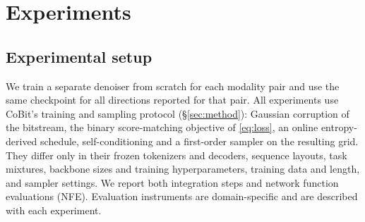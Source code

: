\section{Experiments}
\label{sec:exp}

\subsection{Experimental setup}
\label{sec:exp:setup}

We train a separate denoiser from scratch for each modality pair and use the same checkpoint for all
directions reported for that pair. All experiments use CoBit's training and sampling protocol (\S\ref{sec:method}):
Gaussian corruption of the bitstream, the binary score-matching objective of \eqref{eq:loss}, an
online entropy-derived schedule, self-conditioning and a first-order sampler
on the resulting grid. They differ only in their frozen tokenizers and decoders, sequence layouts, task mixtures,
backbone sizes and training hyperparameters, training data and length, and sampler settings. We report both integration steps and
network function evaluations (NFE). Evaluation instruments are domain-specific and are described with each experiment.



\ifdefined\toyimageonly

\else

\fi


